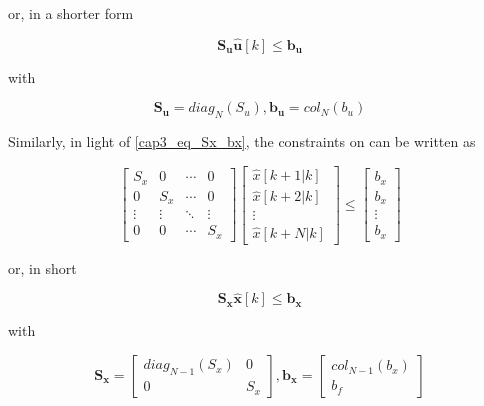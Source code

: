 \noindent
or, in a shorter form

\noindent
\begin{equation}
	\mathbf{S_u \hat{u}}[k] \leq \mathbf{b_u}
\end{equation}

\noindent
with

\noindent
\begin{equation}
	\mathbf{S_u} = diag_N(S_u), \mathbf{b_u} = col_N(b_u)
\end{equation}

Similarly, in light of \eqref{cap3_eq_Sx_bx}, the constraints on  can be written as

\begin{equation}
	\left[
		\begin{matrix}
			S_x & 0 & \cdots & 0 \\
			0 & S_x & \cdots & 0 \\
			\vdots & \vdots & \ddots & \vdots \\
			0 & 0 & \cdots & S_x
		\end{matrix}
	\right]
	\left[
		\begin{matrix}
			\hat{x}[k + 1 | k] \\
			\hat{x}[k + 2 | k] \\
			\vdots \\
			\hat{x}[k + N | k]
		\end{matrix}
	\right]
	\leq
	\left[
		\begin{matrix}
			b_x \\
			b_x \\
			\vdots \\
			b_x
		\end{matrix}
	\right]
\end{equation}

\noindent
or, in short

\noindent
\begin{equation}
	\label{cap3_sx_x_le_bx}
	\mathbf{S_x}\mathbf{\hat{x}}[k] \leq \mathbf{b_x}
\end{equation}

\noindent
with

\noindent
\begin{equation}
	\mathbf{S_x} = 
	\left[
		\begin{matrix}
			diag_{N-1}(S_x) & 0 \\
			0 & S_x
		\end{matrix}
	\right], \mathbf{b_x} = 
	\left[
		\begin{matrix}
			col_{N-1}(b_x) \\
			b_f
		\end{matrix}
	\right]
\end{equation}